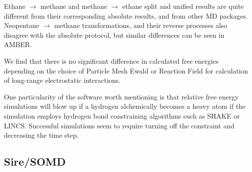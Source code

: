 \documentclass[journal=jctcce,manuscript=article]{achemso}
\begin{document}

Ethane $\rightarrow$ methane and methane $\rightarrow$ ethane split and unified 
results are quite different from their corresponding absolute results, and from other MD packages. %
Neopentane $\rightarrow$ methane transformations, and their reverse processes 
also disagree with the absolute protocol, but similar differences can be seen in AMBER.

We find that there is no significant difference in calculated free energies depending on the choice of 
Particle Mesh Ewald or Reaction Field for calculation of long-range electrostatic interactions. 

One particularity of the software worth mentioning is 
that relative free energy simulations will blow up if a hydrogen alchemically becomes a heavy 
atom if the simulation employs hydrogen bond constraining algorithms such as SHAKE or LINCS.
Successful simulations seem to require turning off the constraint and decreasing the time step.

\subsection{Sire/SOMD}
\label{sec:somd-results}
\end{document}
